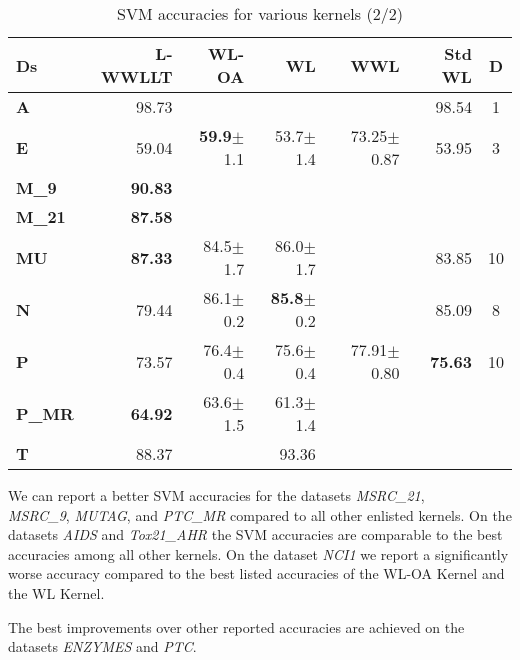     	\begin{table}[h]
    		\centering
    		\begin{tabular}{|l||r|r|r|r|rc|}
    			\hline
    			\textbf{Ds} 	& \textbf{L-WWLLT} 	& \textbf{WL-OA} 		& \textbf{WL} 			& \textbf{WWL} 		& \textbf{Std WL} 	& D 	\\ \hline\hline
    			\textbf{A} 		& 98.73 			& ~ 					& ~ 					& ~ 				& 98.54 			& 1 	\\ \hline
    			\textbf{E} 		& 59.04 			& \textbf{59.9}$\pm$1.1 & 53.7$\pm$1.4 			& 73.25$\pm$0.87 	& 53.95 			& 3 	\\ \hline
    			\textbf{M\_9} 	& \textbf{90.83} 	& ~ 					& ~ 					& ~ 			 	& ~ 				& ~ 	\\ \hline
    			\textbf{M\_21}	& \textbf{87.58} 	& ~ 					& ~ 					& ~				 	& ~ 				& ~ 	\\ \hline    			
    			\textbf{MU} 	& \textbf{87.33} 	& 84.5$\pm$1.7 			& 86.0$\pm$1.7 			& ~ 			 	& 83.85 			& 10	\\ \hline
    			\textbf{N} 		& 79.44 			& 86.1$\pm$0.2 			& \textbf{85.8}$\pm$0.2 & ~ 			 	& 85.09			 	& 8 	\\ \hline
    			\textbf{P} 		& 73.57 			& 76.4$\pm$0.4 			& 75.6$\pm$0.4 			& 77.91$\pm$0.80 	& \textbf{75.63} 	& 10 	\\ \hline
    			\textbf{P\_MR} 	& \textbf{64.92} 	& 63.6$\pm$1.5 			& 61.3$\pm$1.4 			& ~ 			 	& ~ 				& ~ 	\\ \hline
    			\textbf{T} 		& 88.37 			& ~ 					& 93.36 				& ~ 			 	& ~ 				& ~ 	\\ \hline
    		\end{tabular}
    		\caption{SVM accuracies for various kernels (2/2)}\label{tab:SVM_Compared2}
    	\end{table}
    	    
 	  	We can report a better SVM accuracies for the datasets \textit{MSRC\_21},\\
 	  	\textit{MSRC\_9}, \textit{MUTAG}, and \textit{PTC\_MR} compared to all other enlisted kernels.
 	  	On the datasets \textit{AIDS} and \textit{Tox21\_AHR} the SVM accuracies are comparable to the best accuracies among all other kernels.
 	  	On the dataset \textit{NCI1} we report a significantly worse accuracy compared to the best listed accuracies of the WL-OA Kernel and the WL Kernel.
 	  	 	  	
 	  	The best improvements over other reported accuracies are achieved on the datasets \textit{ENZYMES} and \textit{PTC}.
    	    
